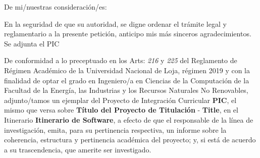 \documentclass[12pt,a4paper,sans]{moderncv}
\newcommand{\titulo}{Título del Proyecto de Titulación}
\newcommand{\tituloEng}{Title}
\newcommand{\lineaInv}{Itinerario de Software}
\begin{document}
\date{Loja, 2 de septiembre del 2022}
\opening{De mi/nuestras consideración/es:}
\closing{En la seguridad de que su autoridad, se digne ordenar el trámite legal y reglamentario a la presente petición, anticipo mis más sinceros agradecimientos. Se adjunta el PIC}
\makelettertitle

De conformidad a lo preceptuado en los Arts: \textit{216} y \textit{225} del Reglamento de Régimen Académico de la Universidad Nacional de Loja, régimen 2019 y con la finalidad de optar el grado en Ingeniero/a en Ciencias de la Computación de la Facultad de la Energía, las Industrias y los Recursos Naturales No Renovables, adjunto/tamos un ejemplar del Proyecto de Integración Curricular \textbf{PIC}, el mismo que versa sobre \textbf{\titulo} - \textbf{\tituloEng}, en el Itinerario \textbf{\lineaInv}, a efecto de que el responsable de la línea de investigación, emita, para su pertinencia respectiva, un informe sobre la coherencia, estructura y pertinencia académica del proyecto; y, si está de acuerdo a su trascendencia, que amerite ser investigado.

\makeletterclosing
\end{document}
